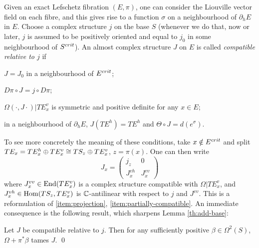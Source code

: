 \documentclass[10pt,letterpaper]{article}
\begin{document}
Given an exact Lefschetz fibration $(E,\pi)$, one can consider the Liouville
vector field on each fibre, and this gives rise to a function $\sigma$ on a
neighbourhood of $\partial_hE$ in $E$. Choose a complex structure $j$ on the
base $S$ (whenever we do that, now or later, $j$ is assumed to be positively
oriented and equal to $j_0$ in some neighbourhood of $S^{crit}$). An almost
complex structure $J$ on $E$ is called {\em compatible relative to $j$} if
\begin{condensedlist}
\item
$J = J_0$ in a neighbourhood of $E^{crit}$;
\item \label{item:projection}
$D\pi \circ J = j \circ D\pi$;
\item \label{item:partially-compatible}
$\Omega(\cdot,J\cdot) | TE_x^v$ is symmetric and positive definite for any $x
\in E$;
\item \label{item:convexity}
in a neighbourhood of $\partial_hE$, $J(TE^h) = TE^h$ and $\Theta \circ J =
d(e^\sigma)$.
\end{condensedlist}
To see more concretely the meaning of these conditions, take $x \notin E^{crit}$
and split $TE_x = TE_x^h \oplus TE_x^v \cong TS_z \oplus TE_x^v$, $z = \pi(x)$.
One can then write
\begin{equation} \label{eq:compatible-j}
 J_x = \begin{pmatrix} j_z & 0 \\ J_x^{vh} & J_x^{vv} \end{pmatrix}
\end{equation}
where $J_x^{vv} \in \mathrm{End}(TE_x^v)$ is a complex structure compatible with
$\Omega|TE_x^v$, and $J_x^{vh} \in \mathrm{Hom}(TS_z,TE_x^v)$ is $\mathbb{C}$-antilinear with
respect to $j$ and $J^{vv}$. This is a reformulation of \ref{item:projection},
\ref{item:partially-compatible}. An immediate consequence is the following
result, which sharpens Lemma \ref{th:add-base}:

\begin{lemma} \label{th:tame}
Let $J$ be compatible relative to $j$. Then for any sufficiently positive
$\beta \in \Omega^2(S)$, $\Omega + \pi^*\beta$ tames $J$. \qed
\end{lemma}
\end{document}
